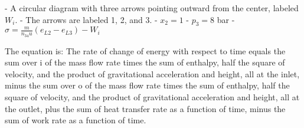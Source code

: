 - A circular diagram with three arrows pointing outward from the center, labeled \( W_i \).
- The arrows are labeled 1, 2, and 3.
- \( x_2 = 1 \)
- \( p_3 = 8 \) bar
- \( \sigma = \frac{m}{n_{34}u} (e_{L2} - e_{L3}) - W_i \)

The equation is:
The rate of change of energy with respect to time equals the sum over i of the mass flow rate times the sum of enthalpy, half the square of velocity, and the product of gravitational acceleration and height, all at the inlet, minus the sum over o of the mass flow rate times the sum of enthalpy, half the square of velocity, and the product of gravitational acceleration and height, all at the outlet, plus the sum of heat transfer rate as a function of time, minus the sum of work rate as a function of time.